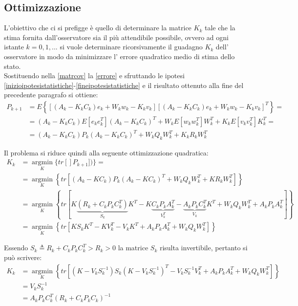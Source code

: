 \subsection{Ottimizzazione}
L'obiettivo che ci si prefigge è quello di determinare la matrice $K_k$ tale che la stima fornita dall'osservatore sia il più attendibile possibile, ovvero ad ogni istante $k=0,1,...$ si vuole determinare ricorsivamente il guadagno $K_k$ dell' osservatore in modo da minimizzare l' errore quadratico medio di stima dello stato.\\
Sostituendo nella \eqref{matrcov} la \eqref{errore} e sfruttando le ipotesi \eqref{inizioipotesistatistiche}-\eqref{fineipotesistatistiche} e il risultato ottenuto alla fine del precedente paragrafo si ottiene: 
\begin{equation}
\begin{split}
P_{k+1} &= E\left\{[(A_k - K_k C_k) e_k + W_k w_k - K_k v_k][(A_k -K_k C_k)e_k+W_k w_k-K_k v_k]^T\right\}=\\
 &= (A_k-K_kC_k)E[e_ke^T_k](A_k-K_kC_k)^T +W_kE[w_kw^T_k]W^T_k + K_kE[v_kv^T_k]K^T_k=\\
&= (A_k-K_kC_k)P_k(A_k-K_kC_k)^T + W_kQ_kW^T_k+K_kR_kW^T_k
\end{split}
\end{equation}

\noindent Il problema si riduce quindi alla seguente ottimizzazione quadratica: 
\begin{equation}
\begin{split}
K_k &= \underset{K}{\operatorname{argmin}}\{tr[]P_{k+1}])\}=\\
&= \underset{K}{\operatorname{argmin}} \left\{ tr \left[(A_k-KC_k)P_k(A_k-KC_k)^T + W_kQ_kW^T_k+KR_kW^T_k\right] \right\} \\
&= \underset{K}{\operatorname{argmin}} \left\{ tr \left[ K\underbrace{(R_k+C_kP_kC_k^T)}_{S_k}K^T-K\underbrace{C_kP_kA_k^T}_{V^T_k}-\underbrace{A_kP_kC_k^T}_{V_k}K^T+W_kQ_kW_k^T+A_kP_kA_k^T \right]\right\} \\
&=  \underset{K}{\operatorname{argmin}} \left\{ tr \left[KS_kK^T-KV^T_k-V_kK^T+A_kP_kA_k^T+W_kQ_kW_k^T\right]\right\}
\end{split}
\end{equation}

\noindent Essendo $S_k \triangleq R_k+C_kP_kC_k^T > R_k > 0 $ la matrice $S_k$ risulta invertibile, pertanto si può scrivere: 
\begin{equation}
\begin{split}
K_k &= \underset{K}{\operatorname{argmin}} \left\{tr\left[(K-V_kS^{-1}_k)S_k(K-V_kS^{-1}_k)^T - V_kS^{-1}_kV^T_k + A_kP_kA_k^T + W_kQ_kW_k^T\right]\right\}\\ 
&= V_kS^{-1}_k\\
&= A_kP_kC_k^T(R_k+C_kP_kC_k)^{-1}
\end{split}
\end{equation}

